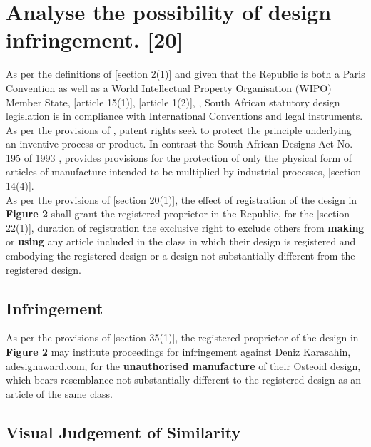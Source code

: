 \documentclass[11pt]{article}
\begin{document}
\section{Analyse the possibility of design infringement. [20]}
\label{sec:org6b13170}

As per the definitions of [section 2(1)]\cite{rsa93_tm_act} and given that the
Republic is both a Paris Convention as well as a World Intellectual Property
Organisation (WIPO) Member State, [article 15(1)]\cite{wto17_trips}, [article
1(2)]\cite{wipo83_paris_conve_protect_ip}, \cite{wipo25_hague_agreement}, South African statutory design
legislation is in compliance with International Conventions and legal instruments.\\

As per the provisions of \cite{rsa78_patents_act}, patent rights seek to protect
the principle underlying an inventive process or product. In contrast the South
African Designs Act No. 195 of 1993 \cite{rsa93_designs_act}, provides provisions
for the protection of only the physical form of articles of manufacture intended
to be multiplied by industrial processes, [section
14(4)]\cite{rsa93_designs_act}.\\

As per the provisions of [section 20(1)]\cite{rsa93_designs_act}, the effect of
registration of the design in \textbf{Figure 2} shall grant the registered proprietor
in the Republic, for the [section 22(1)]\cite{rsa93_designs_act}, duration of
registration the exclusive right to exclude others from \textbf{making} or \textbf{using} any
article included in the class in which their design is registered and embodying
the registered design or a design not substantially different from the
registered design.

\subsection{Infringement}
\label{sec:org43e4950}

As per the provisions of [section 35(1)]\cite{rsa93_designs_act}, the registered
proprietor of the design in \textbf{Figure 2} may institute proceedings for
infringement against Deniz Karasahin, adesignaward.com, for the \textbf{unauthorised
manufacture} of their Osteoid design, which bears resemblance not substantially
different to the registered design as an article of the same class.

\subsection{Visual Judgement of Similarity}
\label{sec:org02d09b5}
\end{document}
